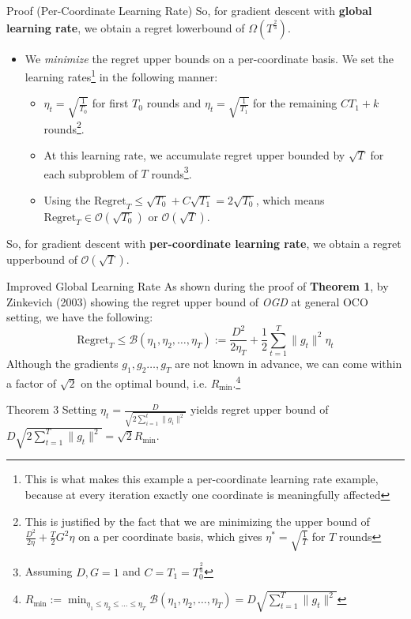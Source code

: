\documentclass[
	11pt, %
]{beamer}
\begin{document}
\begin{frame}{Proof (Per-Coordinate Learning Rate)}
    So, for gradient descent with \textbf{global learning rate}, we obtain a regret lowerbound of $\Omega(T^{\frac{2}{3}})$.
    \begin{itemize}
        \item We \textit{minimize} the regret upper bounds on a per-coordinate basis. We set the learning rates\footnote{This is what makes this example a per-coordinate learning rate example, because at every iteration exactly one coordinate is meaningfully affected} in the following manner:
        \begin{itemize}
            \item $\eta_t = \sqrt{\frac{1}{T_0}}$ for first $T_0$ rounds and $\eta_t = \sqrt{\frac{1}{T_1}}$ for the remaining $CT_1 + k$ rounds\footnote{This is justified by the fact that we are minimizing the upper bound of $\frac{D^2}{2\eta} + \frac{T}{2} G^2 \eta$ on a per coordinate basis, which gives $\eta^* = \sqrt{\frac{1}{T}}$ for $T$ rounds}.
            \item At this learning rate, we accumulate regret upper bounded by $\sqrt{T}$ for each subproblem of $T$ rounds\footnote{Assuming $D, G = 1$ and $C = T_1 = T_0^{\frac{2}{3}}$}.
            \item Using the  $\text{Regret}_T \le \sqrt{T_0} + C \sqrt{T_1} = 2\sqrt{T_0}$, which means $\text{Regret}_T \in \mathcal{O}(\sqrt{T_0})$ or $\mathcal{O}(\sqrt{T})$.
        \end{itemize}
    \end{itemize}
    So, for gradient descent with \textbf{per-coordinate learning rate}, we obtain a regret upperbound of $\mathcal{O}(\sqrt{T})$.
\end{frame}

\begin{frame}{Improved Global Learning Rate}
    As shown during the proof of \textbf{Theorem 1}, by Zinkevich (2003) showing the regret upper bound of \textit{OGD} at general OCO setting, we have the following:
    $$
    \text{Regret}_T \le \mathcal{B}(\eta_1, \eta_2, \dots, \eta_T) := \frac{D^2}{2 \eta_T} + \frac{1}{2} \sum_{t = 1}^{T} \|g_t\|^2 \eta_t
    $$
    Although the gradients $g_1, g_2 \dots, g_T$ are not known in advance, we can come within a factor of $\sqrt{2}$ on the optimal bound, i.e. $R_{\min}$.\footnote{$R_{\min} := \min_{\eta_1 \le \eta_2 \le \dots \le \eta_T} \mathcal{B}(\eta_1, \eta_2, \dots, \eta_T) = D\sqrt{\sum_{t=1}^{T} \|g_t\|^2}$}

    \begin{block}{Theorem 3}
        Setting $\eta_t = \frac{D}{\sqrt{2 \sum_{i=1}^{t} \|g_i\|^2}}$ yields regret upper bound of $D\sqrt{2 \sum_{t=1}^{T} \|g_t\|^2} = \sqrt{2} R_{\min}$.
    \end{block}
\end{frame}
\end{document}
